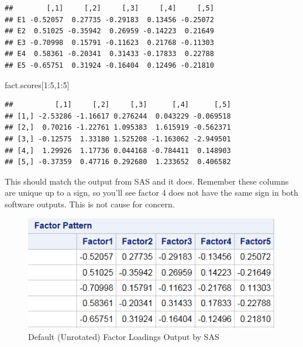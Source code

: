\documentclass[
]{article}
\newenvironment{Shaded}{\begin{snugshade}}{\end{snugshade}}
\newcommand{\DecValTok}[1]{\textcolor[rgb]{0.00,0.00,0.81}{#1}}
\newcommand{\NormalTok}[1]{#1}
\newcommand{\SpecialCharTok}[1]{\textcolor[rgb]{0.00,0.00,0.00}{#1}}
\theoremstyle{definition}
\theoremstyle{definition}
\theoremstyle{definition}
\theoremstyle{definition}
\theoremstyle{remark}
\begin{document}
\begin{verbatim}
##        [,1]     [,2]     [,3]     [,4]     [,5]
## E1 -0.52057  0.27735 -0.29183  0.13456 -0.25072
## E2  0.51025 -0.35942  0.26959 -0.14223  0.21649
## E3 -0.70998  0.15791 -0.11623  0.21768 -0.11303
## E4  0.58361 -0.20341  0.31433 -0.17833  0.22788
## E5 -0.65751  0.31924 -0.16404  0.12496 -0.21810
\end{verbatim}

\begin{Shaded}
\begin{Highlighting}[]
\NormalTok{fact.scores[}\DecValTok{1}\SpecialCharTok{:}\DecValTok{5}\NormalTok{,}\DecValTok{1}\SpecialCharTok{:}\DecValTok{5}\NormalTok{]}
\end{Highlighting}
\end{Shaded}

\begin{verbatim}
##          [,1]     [,2]     [,3]      [,4]      [,5]
## [1,] -2.53286 -1.16617 0.276244  0.043229 -0.069518
## [2,]  0.70216 -1.22761 1.095383  1.615919 -0.562371
## [3,] -0.12575  1.33180 1.525208 -1.163062 -2.949501
## [4,]  1.29926  1.17736 0.044168 -0.784411  0.148903
## [5,] -0.37359  0.47716 0.292680  1.233652  0.406582
\end{verbatim}

This should match the output from SAS and it does. Remember these columns are unique up to a sign, so you'll see factor 4 does not have the same sign in both software outputs. This is not cause for concern.



\begin{figure}

{\centering \includegraphics[width=1\linewidth]{factorOutput} 

}

\caption{Default (Unrotated) Factor Loadings Output by SAS}\label{fig:unnamed-chunk-133}
\end{figure}
\end{document}
